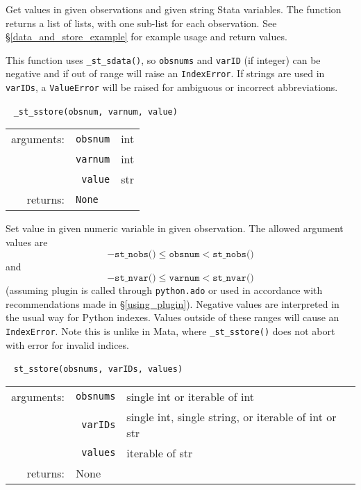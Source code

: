 \documentclass{article}
\begin{document}
			\vspace{1.5mm}
			\noindent Get values in given observations and given string Stata variables. The function returns a list of lists, with one sub-list for each observation. See \S\ref{data_and_store_example} for example usage and return values. 
			
			This function uses \lstinline{_st_sdata()}, so \lstinline{obsnums} and \lstinline{varID} (if integer) can be negative and if out of range will raise an \lstinline{IndexError}. If strings are used in \lstinline{varIDs}, a \lstinline{ValueError} will be raised for ambiguous or incorrect abbreviations. \newline
			
			
			\ \newline
			\noindent \lstinline$_st_sstore(obsnum, varnum, value)$
								
			\vspace{1.5mm}
			\noindent 
			\indent \begin{tabular}{rrl}
					arguments: & \texttt{obsnum} & int \\
					  & \texttt{varnum} & int \\						
						& \texttt{value} & str \\
					returns: & \multicolumn{2}{l}{\texttt{None}}
				\end{tabular}
								
			\vspace{1.5mm}
			\noindent Set value in given numeric variable in given observation. The allowed argument values are 
			\[
				-\texttt{st\_nobs()} \leq \texttt{obsnum} < \texttt{st\_nobs()}
			\]
			and
			\[
				-\texttt{st\_nvar()} \leq \texttt{varnum} < \texttt{st\_nvar()}
			\]
			(assuming plugin is called through \lstinline$python.ado$ or used in accordance with recommendations made in \S\ref{using_plugin}). Negative values are interpreted in the usual way for Python indexes. Values outside of these ranges will cause an \lstinline$IndexError$. Note this is unlike in Mata, where \lstinline{_st_sstore()} does not abort with error for invalid indices. \newline
			
			
			\ \newline
			\noindent \lstinline$st_sstore(obsnums, varIDs, values)$
								
			\vspace{1.5mm}
			\noindent 
			\indent \begin{tabular}{rrl}
					arguments: & \texttt{obsnums} & single int or iterable of int \\
						& \texttt{varIDs} & single int, single string, or iterable of int or str \\
						& \texttt{values} & iterable of str \\
					returns: & \multicolumn{2}{l}{None}
				\end{tabular}
								
\end{document}
